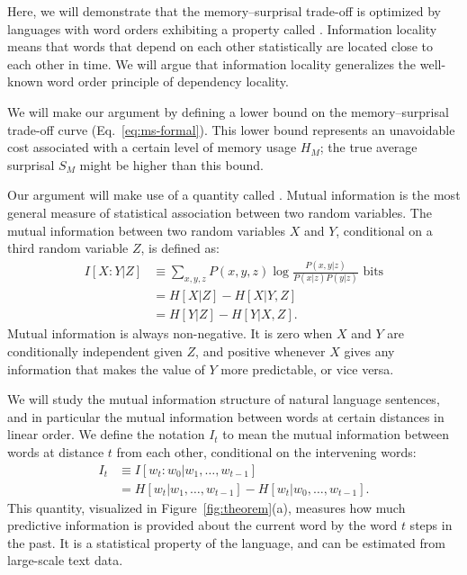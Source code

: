 Here, we will demonstrate that the memory--surprisal trade-off is optimized by languages with word orders exhibiting a property called . Information locality means that words that depend on each other statistically are located close to each other in time. We will argue that information locality generalizes the well-known word order principle of dependency locality.

We will make our argument by defining a lower bound on the memory--surprisal trade-off curve (Eq.~\ref{eq:ms-formal}). This lower bound represents an unavoidable cost associated with a certain level of memory usage $H_M$; the true average surprisal $S_M$ might be higher than this bound. 

Our argument will make use of a quantity called . Mutual information is the most general measure of statistical association between two random variables. The mutual information between two random variables $X$ and $Y$, conditional on a third random variable $Z$, is defined as:
\begin{align}
\label{eq:mi}
    I[X:Y|Z] &\equiv \sum_{x,y,z} P(x,y,z) \log \frac{P(x,y|z)}{P(x|z)P(y|z)} \text{ bits} \\
    \nonumber
    &= H[X|Z] - H[X|Y,Z] \\
    \nonumber
    &= H[Y|Z] - H[Y|X,Z].
\end{align}
Mutual information is always non-negative. It is zero when $X$ and $Y$ are conditionally independent given $Z$, and positive whenever $X$ gives any information that makes the value of $Y$ more predictable, or vice versa. 

We will study the mutual information structure of natural language sentences, and in particular the mutual information between words at certain distances in linear order. We define the notation $I_t$ to mean the mutual information between words at distance $t$ from each other, conditional on the intervening words:
\begin{align}
    \nonumber
    I_t &\equiv I[w_t : w_0 | w_1, \dots, w_{t-1}] \\
    \nonumber
    &= H[w_t | w_1, \dots, w_{t-1}] - H[w_t | w_0, \dots, w_{t-1}].
\end{align}
This quantity, visualized in Figure~\ref{fig:theorem}(a), measures how much predictive information is provided about the current word by the word $t$ steps in the past.
It is a statistical property of the language, and can be estimated from large-scale text data.

